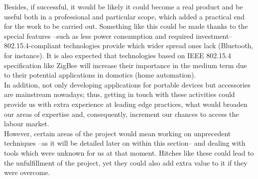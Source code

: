 		Besides, if successful, it would be likely it could become a real product
		and be useful both in a professional and particular scope, which added a practical
		end for the work to be carried out. Something like this could be made thanks to
		the special features --such as less power consumption and required investment-- 802.15.4-compliant
		technologies provide which wider spread ones lack (Bluetooth, for instance). It is also
		expected that technologies based on IEEE 802.15.4 specification like ZigBee will increase their
		importance in the medium term due to their potential applications in domotics (home automation).\\

		In addition, not only developing applications for portable devices but accessories
		are mainstream nowadays; thus, getting in touch with these activities could
		provide us with extra experience at leading edge practices, what would broaden our areas of
		expertise and, consequently, increment our chances to access the labour market.\\

		However, certain areas of the project would mean working on unprecedent techniques
		--as it will be detailed later on within this section-- and dealing with tools
		which were unknown for us at that moment. Hitches like these could lead to the
		unfulfillment of the project, yet they could also add extra value to it if 
		they were overcome.\\
		
